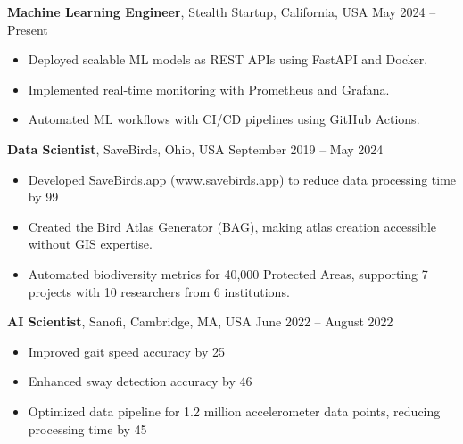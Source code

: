 \documentclass[a4paper,10pt]{article}
\begin{document}
\vspace{4pt}
{\bfseries Machine Learning Engineer}, Stealth Startup, California, USA \hfill May 2024 -- Present

\begin{itemize}
    \item Deployed scalable ML models as REST APIs using FastAPI and Docker.
    
    \item Implemented real-time monitoring with Prometheus and Grafana.
    
    \item Automated ML workflows with CI/CD pipelines using GitHub Actions.
\end{itemize}

\vspace{4pt}
{\bfseries Data Scientist}, SaveBirds, Ohio, USA \hfill September 2019 -- May 2024

\begin{itemize}
    \item Developed SaveBirds.app (www.savebirds.app) to reduce data processing time by 99%
    
    \item Created the Bird Atlas Generator (BAG), making atlas creation accessible without GIS expertise.
    
    \item Automated biodiversity metrics for 40,000 Protected Areas, supporting 7 projects with 10 researchers from 6 institutions.
\end{itemize}

\vspace{4pt}
{\bfseries AI Scientist}, Sanofi, Cambridge, MA, USA \hfill June 2022 -- August 2022

\begin{itemize}
    \item Improved gait speed accuracy by 25%
    
    \item Enhanced sway detection accuracy by 46%
    
    \item Optimized data pipeline for 1.2 million accelerometer data points, reducing processing time by 45%
\end{itemize}
\end{document}
